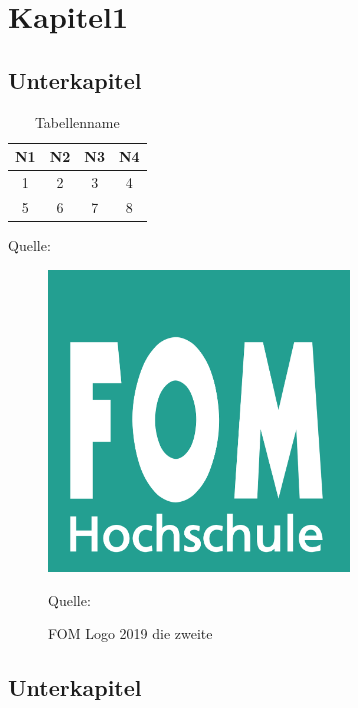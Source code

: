 \chapter{Kapitel1}
\blindtext{}

\section{Unterkapitel}
\blindtext{}\autocite[Vgl.][14]{seiter2017business}

\begin{table}[H]
	\centering
	\caption{Tabellenname}
	\label{table:example}
	\begin{tabular}{||c c c c||}
		\hline
		N1 & N2 & N3 & N4
		\\ [0.5ex]
		\hline\hline
		1 & 2 & 3 & 4\\
		5 & 6 & 7 & 8\\
		[1ex]
		\hline
	\end{tabular}
	\par\smallskip 
	Quelle: \cite[13]{elk}
\end{table}

\blindtext{}

\begin{figure}[H] 
   \centering 
   \caption{FOM Logo 2019 die zweite} 
   \label{fig:fom_logo2} 
   \includegraphics[width=8cm]{Abbildungen/fom_logo.png} 
   \par\smallskip 
   Quelle: \cite[12]{elk} 
\end{figure} 


\blindtext{}

\section{Unterkapitel}
\blindtext{}\autocite[Vgl.]{gluchowski2016business}
\blindtext{}